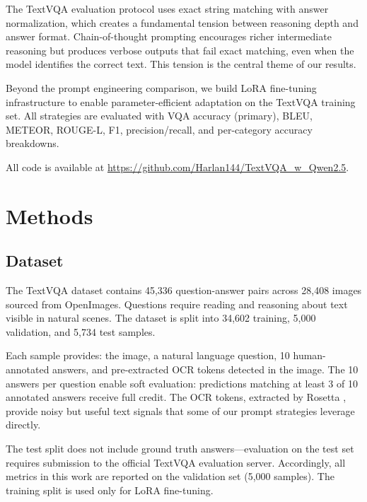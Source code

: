 \documentclass[11pt]{article}
\begin{document}
The TextVQA evaluation protocol uses exact string matching with answer normalization, which creates a fundamental tension between reasoning depth and answer format. Chain-of-thought prompting encourages richer intermediate reasoning but produces verbose outputs that fail exact matching, even when the model identifies the correct text. This tension is the central theme of our results.

Beyond the prompt engineering comparison, we build LoRA fine-tuning infrastructure to enable parameter-efficient adaptation on the TextVQA training set. All strategies are evaluated with VQA accuracy (primary), BLEU, METEOR, ROUGE-L, F1, precision/recall, and per-category accuracy breakdowns.

All code is available at \url{https://github.com/Harlan144/TextVQA_w_Qwen2.5}.


\section{Methods}

\subsection{Dataset}

The TextVQA dataset \citep{singh2019textvqa} contains 45,336 question-answer pairs across 28,408 images sourced from OpenImages. Questions require reading and reasoning about text visible in natural scenes. The dataset is split into 34,602 training, 5,000 validation, and 5,734 test samples.

Each sample provides: the image, a natural language question, 10 human-annotated answers, and pre-extracted OCR tokens detected in the image. The 10 answers per question enable soft evaluation: predictions matching at least 3 of 10 annotated answers receive full credit. The OCR tokens, extracted by Rosetta \citep{borisyuk2018rosetta}, provide noisy but useful text signals that some of our prompt strategies leverage directly.

The test split does not include ground truth answers---evaluation on the test set requires submission to the official TextVQA evaluation server. Accordingly, all metrics in this work are reported on the validation set (5,000 samples). The training split is used only for LoRA fine-tuning.

\end{document}
